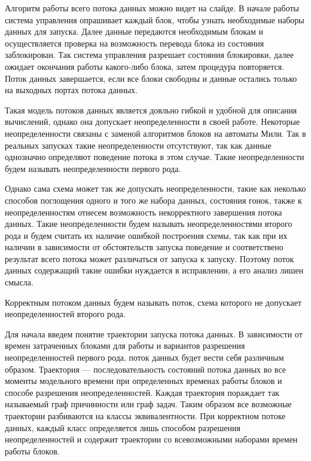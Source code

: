 \documentclass[10pt,a4paper,onecolumn]{report}
\begin{document}
  Алгоритм работы всего потока данных можно видет на слайде.
  В начале работы система управления опрашивает каждый блок, чтобы узнать необходимые наборы данных для запуска.
  Далее данные передаются необходимым блокам и осуществляется проверка на возможность перевода блока из состояния заблокирован.
  Так система управления разрешает состояния блокировки, далее ожидает окончания работы какого-либо блока, затем процедура повторяется.
  Поток данных завершается, если все блоки свободны и данные остались только на выходных портах потока данных.
  
  Такая модель потоков данных является довльно гибкой и удобной для описания вычислений, однако она допускает неопределенности в своей работе.
  Некоторые неопределенности связаны с заменой алгоритмов блоков на автоматы Мили. Так в реальных запусках такие неопределенности отсутствуют, так
  как данные однозначно определяют поведение потока в этом случае. Такие неопределенности будем называть неопределенности первого рода.
  
  Однако сама схема может так же допускать неопределенности, такие как неколько способов поглощения одного и того же набора данных,
  состояния гонок, также к неопределенностям отнесем возможность некорректного завершения потока данных. Такие неопределенности будем называть
  неопределенностями второго рода и будем считать их наличие ошибкой построения схемы, так как при их наличии в зависимости от обстоятельств запуска поведение и соответствено результат
  всего потока может различаться от запуска к запуску. Поэтому поток данных содержащий такие ошибки нуждается в исправлении, а его анализ лишен смысла.
  
  Корректным потоком данных будем называть поток, схема которого не допускает неопределенностей второго рода.
  
  Для начала введем понятие траектории запуска потока данных. В зависимости от времен затраченных блоками для работы и вариантов разрешения неопределенностей первого рода,
  поток данных будет вести себя различным образом. Траектория --- последовательность состояний потока данных во все моменты модельного времени при определенных
  временах работы блоков и способе разрешения неопределенностей. Каждая траектория пораждает так называемый граф причинности или граф задач.
  Таким образом все возможные траектории разбиваются на классы эквивалентности. При корректном потоке данных, каждый класс определяется лишь способом
  разрешения неопределенностей и содержит траектории со всевозможными наборами времен работы блоков.
  
\end{document}
